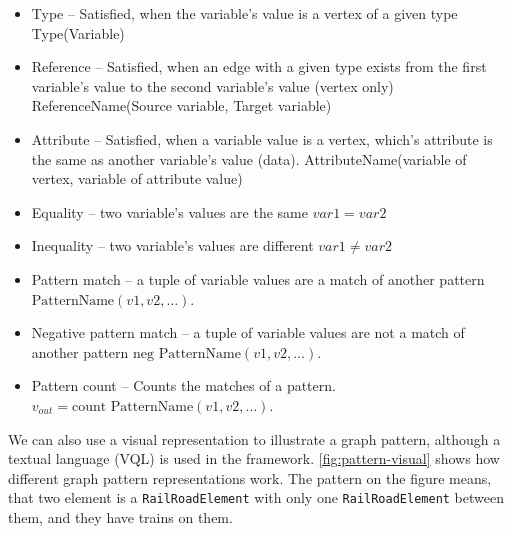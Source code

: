 \begin{itemize}
	\item Type -- Satisfied, when the variable's value is a vertex of a given type
	\newline Type(Variable)
	
	\item Reference -- Satisfied, when an edge with a given type exists from the first variable's value to the second variable's value (vertex only)
	\newline ReferenceName(Source variable, Target variable)
	
	\item Attribute -- Satisfied, when a variable value is a vertex, which's attribute is the same as another variable's value (data).
	\newline AttributeName(variable of vertex, variable of attribute value)
		
	\item Equality -- two variable's values are the same
	\newline $\mathit{var1} = \mathit{var2}$
		
	\item Inequality -- two variable's values are different
	\newline $\mathit{var1} \neq \mathit{var2}$
	
	\item Pattern match -- a tuple of variable values are a match of another pattern	
	\newline $\text{PatternName}(\mathit{v1}, \mathit{v2}, \dots{})$.
	
	\item Negative pattern match -- a tuple of variable values are not a match of another pattern	
	\newline $\text{neg PatternName}(\mathit{v1}, \mathit{v2}, \dots{})$.
	
	\item Pattern count -- Counts the matches of a pattern.
	\newline $v_{out} = \text{count PatternName}(\mathit{v1}, \mathit{v2}, \dots{})$.
\end{itemize}

We can also use a visual representation to illustrate a graph pattern, although a textual language (VQL) is used in the framework. 
\autoref{fig:pattern-visual} shows how different graph pattern representations work. The pattern on the figure means, that two element is a \texttt{RailRoadElement} with only one \texttt{RailRoadElement} between them, and they have trains on them.



